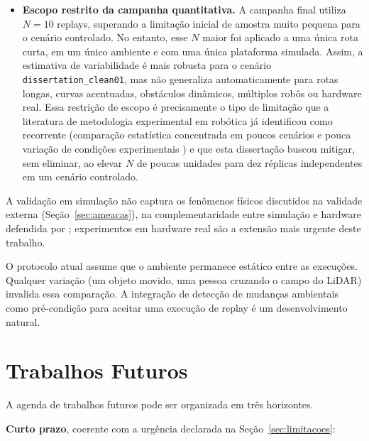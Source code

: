 \begin{itemize}
    \item \textbf{Escopo restrito da campanha quantitativa.} A campanha final
    utiliza $N=10$ replays, superando a limitação inicial de amostra muito
    pequena para o cenário controlado. No entanto, esse $N$ maior foi aplicado a
    uma única rota curta, em um único ambiente e com uma única plataforma
    simulada. Assim, a estimativa de variabilidade é mais robusta para o cenário
    \texttt{dissertation\_\allowbreak clean01}, mas não generaliza automaticamente
    para rotas longas, curvas acentuadas, obstáculos dinâmicos, múltiplos robôs
    ou hardware real. Essa restrição de escopo é precisamente o tipo de
    limitação que a literatura de metodologia experimental em robótica já
    identificou como recorrente (comparação estatística concentrada em
    poucos cenários e pouca variação de condições experimentais
    \cite{amigoni2014}) e que esta dissertação buscou mitigar, sem
    eliminar, ao elevar $N$ de poucas unidades para dez réplicas independentes
    em um cenário controlado.
\end{itemize}

A validação em simulação não captura os fenômenos físicos discutidos na
validade externa (Seção~\ref{sec:ameacas}), na complementaridade entre simulação
e hardware defendida por ; experimentos em hardware
real são a extensão mais urgente deste trabalho.

O protocolo atual assume que o ambiente permanece estático entre as execuções.
Qualquer variação (um objeto movido, uma pessoa cruzando o campo do LiDAR)
invalida essa comparação. A integração de detecção de mudanças ambientais
como pré-condição para aceitar uma execução de replay é um desenvolvimento natural.

\section{Trabalhos Futuros}
\label{sec:futuros}

A agenda de trabalhos futuros pode ser organizada em três horizontes.

\textbf{Curto prazo}, coerente com a urgência declarada na Seção~\ref{sec:limitacoes}:

